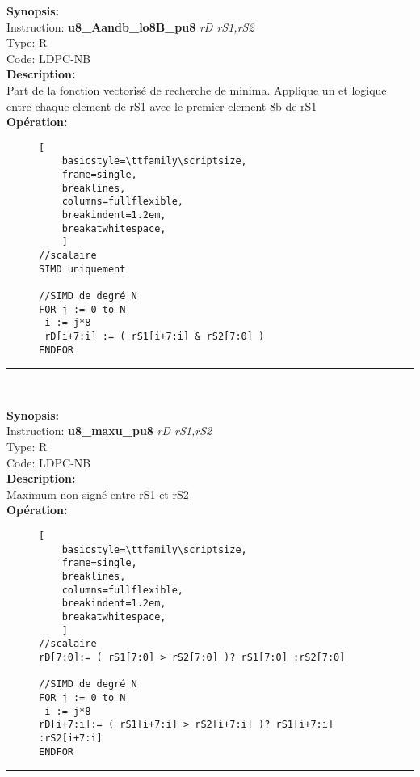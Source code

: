 {\scriptsize
\textbf{Synopsis:}\\
Instruction: \textbf{u8\_Aandb\_lo8B\_pu8 } \textit{rD rS1,rS2}\\
Type: R\\
Code: LDPC-NB\\
\textbf{Description:}\\
Part de la fonction vectorisé de recherche de minima.
Applique un et logique entre chaque element de rS1 avec le premier element 8b de rS1\\
\textbf{Opération:}\\
    \begin{figure}[H]
    \begin{lstlisting}[
    basicstyle=\ttfamily\scriptsize,
    frame=single,
    breaklines,
    columns=fullflexible,
    breakindent=1.2em,
    breakatwhitespace,
    ]
//scalaire
SIMD uniquement 
    
//SIMD de degré N
FOR j := 0 to N
 i := j*8
 rD[i+7:i] := ( rS1[i+7:i] & rS2[7:0] ) 
ENDFOR
\end{lstlisting}
\end{figure}
}
\rule{8cm}{0.4pt}\\
{\scriptsize
\textbf{Synopsis:}\\
Instruction: \textbf{u8\_maxu\_pu8 } \textit{rD rS1,rS2}\\
Type: R\\
Code: LDPC-NB\\
\textbf{Description:}\\
Maximum non signé entre rS1 et rS2\\
\textbf{Opération:}\\
    \begin{figure}[H]
    \begin{lstlisting}[
    basicstyle=\ttfamily\scriptsize,
    frame=single,
    breaklines,
    columns=fullflexible,
    breakindent=1.2em,
    breakatwhitespace,
    ]
//scalaire
rD[7:0]:= ( rS1[7:0] > rS2[7:0] )? rS1[7:0] :rS2[7:0]
    
//SIMD de degré N
FOR j := 0 to N
 i := j*8
rD[i+7:i]:= ( rS1[i+7:i] > rS2[i+7:i] )? rS1[i+7:i] :rS2[i+7:i]
ENDFOR
\end{lstlisting}
\end{figure}
}
\rule{8cm}{0.4pt}\\
